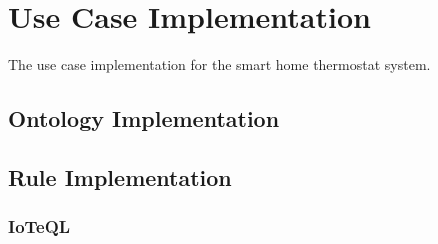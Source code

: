 \chapter{Use Case Implementation}

The use case implementation for the smart home thermostat system.

\section{Ontology Implementation}

\section{Rule Implementation}

\subsection{IoTeQL}

  
